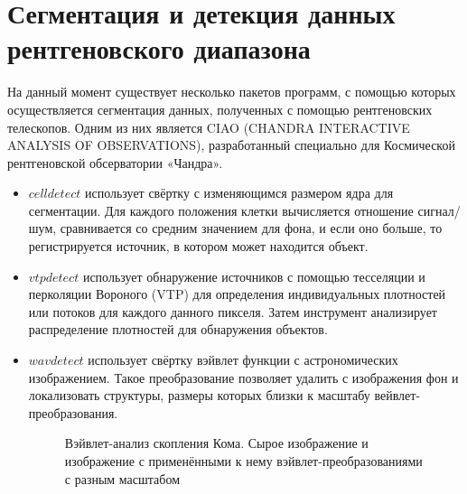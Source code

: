 \section{Сегментация и детекция данных рентгеновского диапазона}

На данный момент существует несколько пакетов программ, с помощью которых осуществляется 
сегментация данных, полученных с помощью рентгеновских телескопов. Одним из них является CIAO 
(CHANDRA INTERACTIVE ANALYSIS OF OBSERVATIONS), разработанный специально для Космической 
рентгеновской обсерватории «Чандра». \\

\begin{itemize}
    \item $celldetect$ использует свёртку с изменяющимся размером ядра для сегментации. Для каждого
        положения клетки вычисляется отношение сигнал/шум, сравнивается со средним значением для 
        фона, и если оно больше, то регистрируется источник, в котором может находится объект.
    \item $vtpdetect$ использует обнаружение источников с помощью тесселяции и перколяции Вороного 
        (VTP) для определения индивидуальных плотностей или потоков для каждого данного пикселя. 
        Затем инструмент анализирует распределение плотностей для обнаружения объектов.
    \item $wavdetect$ использует свёртку вэйвлет функции с астрономических изображением. Такое 
		преобразование позволяет удалить с изображения фон и локализовать структуры, размеры 
		которых близки к масштабу вейвлет-преобразования.
		\begin{figure}[htp]
			\caption{Вэйвлет-анализ скопления Кома. Сырое изображение и изображение с применёнными 
				к нему вэйвлет-преобразованиями с разным масштабом \cite{Vikhlinin}}
		\end{figure}
\end{itemize}


